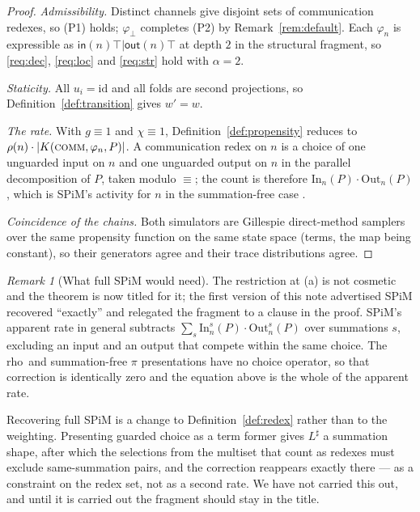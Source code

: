\documentclass[11pt,a4paper]{article}
\theoremstyle{plain}
\theoremstyle{definition}
\theoremstyle{remark}
\newtheorem{remark}[theorem]{Remark}
\newcommand{\rhoc}{\textsf{rho}}
\newcommand{\sepc}{\mathbin{\big|}}
\newcommand{\out}{\mathsf{out}}
\newcommand{\inn}{\mathsf{in}}
\newcommand{\wmap}{w}
\newcommand{\gfac}{g}
\begin{document}
\begin{proof}
\emph{Admissibility.} Distinct channels give disjoint sets of communication redexes, so (P1) holds;
$\varphi_\bot$ completes (P2) by Remark~\ref{rem:default}. Each $\varphi_n$ is expressible as
$\inn(n)\top \sepc \out(n)\top$ at depth $2$ in the structural fragment, so \ref{req:dec},
\ref{req:loc} and \ref{req:str} hold with $\alpha = 2$.

\emph{Staticity.} All $u_i = \mathrm{id}$ and all folds are second projections, so
Definition~\ref{def:transition} gives $\wmap' = \wmap$.

\emph{The rate.} With $\gfac \equiv 1$ and $\chi \equiv 1$,
Definition~\ref{def:propensity} reduces to $\rho(n)\cdot|K(\textsc{comm},\varphi_n,P)|$. A
communication redex on $n$ is a choice of one unguarded input on $n$ and one unguarded output on $n$
in the parallel decomposition of $P$, taken modulo $\equiv$; the count is therefore
$\mathrm{In}_n(P)\cdot\mathrm{Out}_n(P)$, which is SPiM's activity for $n$ in the summation-free case
\cite{spim-sim}.

\emph{Coincidence of the chains.} Both simulators are Gillespie direct-method samplers over the same
propensity function on the same state space (terms, the map being constant), so their generators
agree and their trace distributions agree.
\end{proof}

\begin{remark}[What full SPiM would need]
\label{rem:spim-scope}
The restriction at (a) is not cosmetic and the theorem is now titled for it; the first version of
this note advertised SPiM recovered ``exactly'' and relegated the fragment to a clause in the proof.
SPiM's apparent rate in general subtracts $\sum_{s}\mathrm{In}_n^s(P)\cdot\mathrm{Out}_n^s(P)$ over
summations $s$, excluding an input and an output that compete within the same choice. The \rhoc\ and
summation-free $\pi$ presentations have no choice operator, so that correction is identically zero
and the equation above is the whole of the apparent rate.

Recovering full SPiM is a change to Definition~\ref{def:redex} rather than to the weighting.
Presenting guarded choice as a term former gives $L^\sharp$ a summation shape, after which the
selections from the multiset that count as redexes must exclude same-summation pairs, and the
correction reappears exactly there --- as a constraint on the redex set, not as a second rate. We
have not carried this out, and until it is carried out the fragment should stay in the title.
\end{remark}
\end{document}

